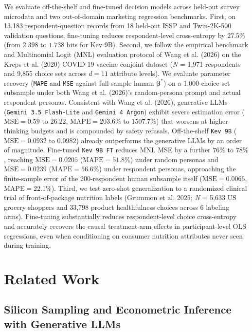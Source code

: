 \documentclass[
  letterpaper,
  DIV=11,
  numbers=noendperiod]{scrartcl}
\begin{document}
We evaluate off-the-shelf and fine-tuned decision models across held-out
survey microdata and two out-of-domain marketing regression benchmarks.
First, on 13,183 respondent-question records from 18 held-out ISSP and
Twin-2K-500 validation questions, fine-tuning reduces respondent-level
cross-entropy by \(27.5\%\) (from \(2.398\) to \(1.738\) bits for Kev
9B). Second, we follow the empirical benchmark and Multinomial Logit
(MNL) evaluation protocol of Wang et al. (2026) on the Kreps et al.
(2020) COVID-19 vaccine conjoint dataset (\emph{N} = 1,971 respondents
and 9,855 choice sets across \(d = 11\) attribute levels). We evaluate
parameter recovery (\texttt{MAPE} and \texttt{MSE} against full-sample
human \(\boldsymbol{\beta}^*\)) on a 1,000-choice-set subsample under
both Wang et al. (2026)'s random-persona prompt and actual respondent
personas. Consistent with Wang et al. (2026), generative LLMs
(\texttt{Gemini\ 3.5\ Flash-Lite} and \texttt{Gemini\ 4\ Argon}) exhibit
severe estimation error (\(\mathrm{MSE} = 0.59\) to \(26.22\),
\(\mathrm{MAPE} = 203.6\%\) to \(1507.7\%\)) that worsens at higher
thinking budgets and is compounded by safety refusals. Off-the-shelf
\texttt{Kev\ 9B} (\(\mathrm{MSE} = 0.0932\) to \(0.0982\)) already
outperforms the generative LLMs by an order of magnitude. Fine-tuned
\texttt{Kev\ 9B\ FT} reduces MNL MSE by a further \(76\%\) to \(78\%\),
reaching \(\mathrm{MSE} = 0.0205\) (\(\mathrm{MAPE} = 51.8\%\)) under
random personas and \(\mathrm{MSE} = 0.0239\)
(\(\mathrm{MAPE} = 56.6\%\)) under respondent personas, approaching the
finite-sample error of the 200-respondent human subsample itself
(\(\mathrm{MSE} = 0.0065\), \(\mathrm{MAPE} = 22.1\%\)). Third, we test
zero-shot generalization to a randomized clinical trial of
front-of-package nutrition labels (Grummon et al. 2025; \emph{N} = 5,633
US grocery shoppers and 33,798 product healthfulness choices across 6
labeling arms). Fine-tuning substantially reduces respondent-level
choice cross-entropy and accurately recovers the causal treatment-arm
effects in participant-level OLS regressions, even when conditioning on
consumer nutrition attributes never seen during training.

\section{Related Work}\label{sec-related}

\subsection{Silicon Sampling and Econometric Inference with Generative
LLMs}\label{silicon-sampling-and-econometric-inference-with-generative-llms}
\end{document}
